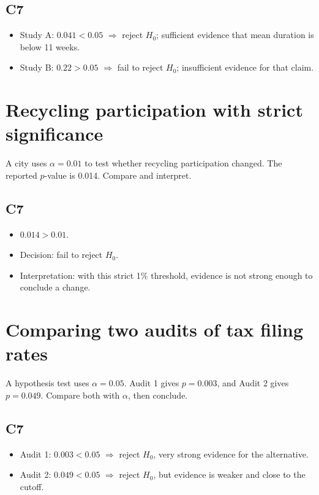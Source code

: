 \begin{ExamProblems}
\subsection*{C7}
\begin{itemize}
    \item Study A: \(0.041<0.05\) \(\Rightarrow\) reject \(H_0\); sufficient evidence that mean duration is below 11 weeks.
    \item Study B: \(0.22>0.05\) \(\Rightarrow\) fail to reject \(H_0\); insufficient evidence for that claim.
\end{itemize}

\item
\section{Recycling participation with strict significance}
A city uses \(\alpha=0.01\) to test whether recycling participation changed. The reported \(p\)-value is 0.014. Compare and interpret.

\subsection*{C7}
\begin{itemize}
    \item \(0.014>0.01\).
    \item Decision: fail to reject \(H_0\).
    \item Interpretation: with this strict 1\% threshold, evidence is not strong enough to conclude a change.
\end{itemize}

\item
\section{Comparing two audits of tax filing rates}
A hypothesis test uses \(\alpha=0.05\). Audit 1 gives \(p=0.003\), and Audit 2 gives \(p=0.049\). Compare both with \(\alpha\), then conclude.

\subsection*{C7}
\begin{itemize}
    \item Audit 1: \(0.003<0.05\) \(\Rightarrow\) reject \(H_0\), very strong evidence for the alternative.
    \item Audit 2: \(0.049<0.05\) \(\Rightarrow\) reject \(H_0\), but evidence is weaker and close to the cutoff.
\end{itemize}


\end{ExamProblems}
